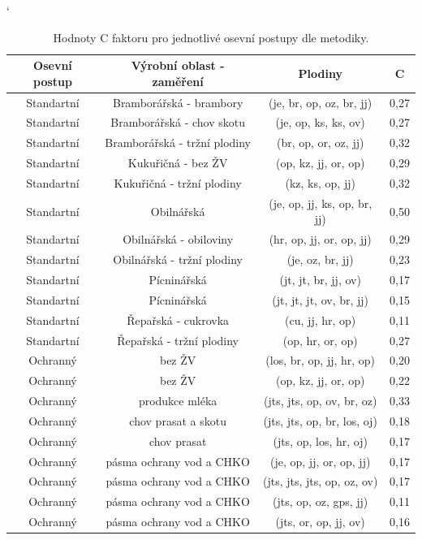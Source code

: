 \begin{table}[!h]
\begin{center}
\catcode`
    \noindent\begin{tabular}{|*{4}{c|}}
    \hline
    \bf Osevní postup & \bf Výrobní oblast - zaměření & \bf Plodiny & \bf C\\
\hline Standartní & Bramborářská - brambory & (je, br, op, oz, br, jj)	& 0,27\\
\hline Standartní & Bramborářská - chov skotu& (je, op, ks, ks, ov) &0,27\\
\hline Standartní & Bramborářská - tržní plodiny &(br, op, or, oz, jj)& 0,32\\
\hline Standartní & Kukuřičná - bez ŽV &(op, kz, jj, or, op)& 0,29\\
\hline Standartní & Kukuřičná - tržní plodiny &(kz, ks, op, jj)& 0,32\\
\hline Standartní & Obilnářská &(je, op, jj, ks, op, br, jj)& 0,50\\
\hline Standartní & Obilnářská - obiloviny &(hr, op, jj, or, op, jj)& 0,29\\
\hline Standartní & Obilnářská - tržní plodiny &(je, oz, br, jj)& 0,23\\
\hline Standartní & Pícninářská &(jt, jt, br, jj, ov)&  0,17\\
\hline Standartní & Pícninářská &(jt, jt, jt, ov, br, jj)& 0,15\\
\hline Standartní & Řepařská - cukrovka & (cu, jj, hr, op) &0,11\\
\hline Standartní & Řepařská - tržní plodiny &(op, hr, or, op)& 0,27\\
\hline Ochranný & bez ŽV &(los, br, op, jj, hr, op)& 0,20\\
\hline Ochranný & bez ŽV &(op, kz, jj, or, op)& 0,22\\
\hline Ochranný & produkce mléka & (jts, jts, op, ov, br, oz)& 0,33\\
\hline Ochranný & chov prasat a skotu & (jts, jts, op, br, los, oj)& 0,18\\
\hline Ochranný & chov prasat & (jts, op, los, hr, oj)& 0,17\\
\hline Ochranný &  pásma ochrany vod a CHKO &(je, op, jj, or, op, jj)& 0,17\\
\hline Ochranný &  pásma ochrany vod a CHKO &(jts, jts, jts, op, oz, ov)& 0,17\\
\hline Ochranný &  pásma ochrany vod a CHKO &(jts, op, oz, gps, jj) & 0,11\\
\hline Ochranný &  pásma ochrany vod a CHKO &(jts, or, op, jj, ov) & 0,16\\
\hline
    \end{tabular}\\
  \caption[Hodnoty C faktoru pro jednotlivé osevní postupy]{Hodnoty C faktoru pro jednotlivé osevní postupy dle metodiky\cite{janecek2012}.}
  \label{osevni_c}
\end{center}
\end{table}
\FloatBarrier
